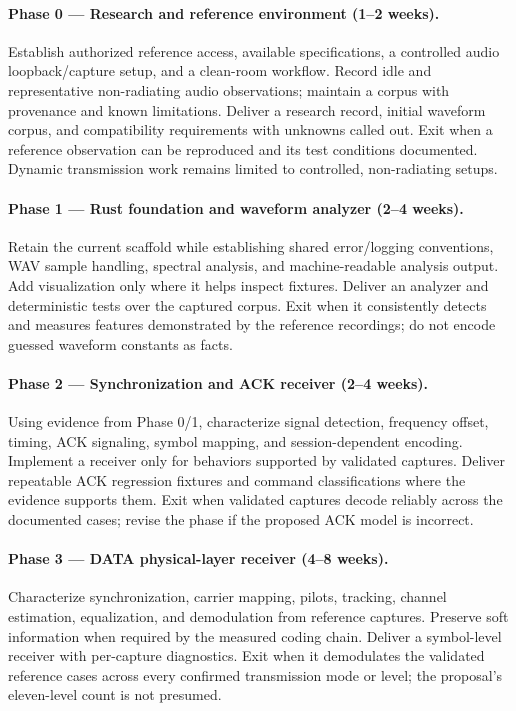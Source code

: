 \documentclass[11pt,a4paper]{article}
\begin{document}
\paragraph{Phase 0 --- Research and reference environment (1--2 weeks).}
Establish authorized reference access, available specifications, a controlled
audio loopback/capture setup, and a clean-room workflow. Record idle and
representative non-radiating audio observations; maintain a corpus with
provenance and known limitations. Deliver a research record, initial waveform
corpus, and compatibility requirements with unknowns called out. Exit when a
reference observation can be reproduced and its test conditions documented.
Dynamic transmission work remains limited to controlled, non-radiating setups.

\paragraph{Phase 1 --- Rust foundation and waveform analyzer (2--4 weeks).}
Retain the current scaffold while establishing shared error/logging
conventions, WAV sample handling, spectral analysis, and machine-readable
analysis output. Add visualization only where it helps inspect fixtures.
Deliver an analyzer and deterministic tests over the captured corpus. Exit
when it consistently detects and measures features demonstrated by the
reference recordings; do not encode guessed waveform constants as facts.

\paragraph{Phase 2 --- Synchronization and ACK receiver (2--4 weeks).}
Using evidence from Phase 0/1, characterize signal detection, frequency offset,
timing, ACK signaling, symbol mapping, and session-dependent encoding.
Implement a receiver only for behaviors supported by validated captures.
Deliver repeatable ACK regression fixtures and command classifications where
the evidence supports them. Exit when validated captures decode reliably
across the documented cases; revise the phase if the proposed ACK model is
incorrect.

\paragraph{Phase 3 --- DATA physical-layer receiver (4--8 weeks).}
Characterize synchronization, carrier mapping, pilots, tracking, channel
estimation, equalization, and demodulation from reference captures. Preserve
soft information when required by the measured coding chain. Deliver a
symbol-level receiver with per-capture diagnostics. Exit when it demodulates
the validated reference cases across every confirmed transmission mode or
level; the proposal's eleven-level count is not presumed.
\end{document}
